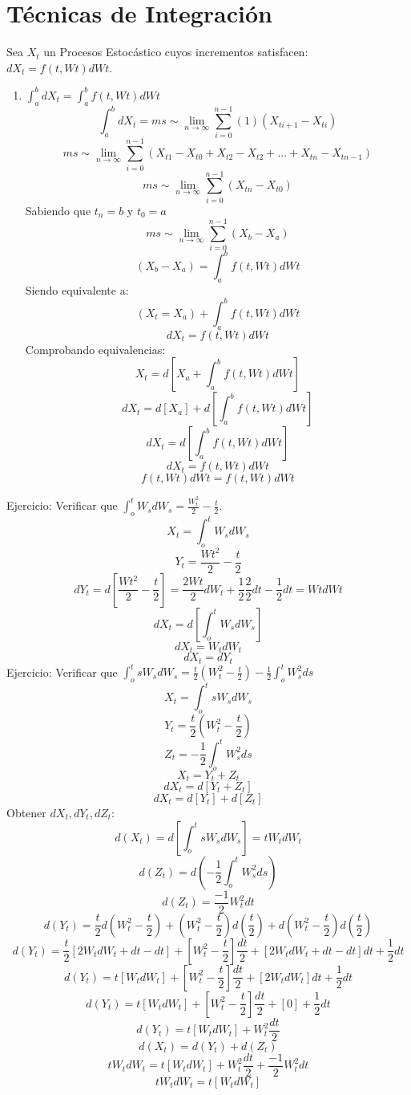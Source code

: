 \documentclass[11pt,fleqn]{book} %
\numberwithin{equation}{section} %
\numberwithin{figure}{section} %
\numberwithin{table}{section} %
\begin{document}
\section{Técnicas de Integración}
Sea $X_t$ un Procesos Estocástico cuyos incrementos satisfacen: $dX_t = f(t,Wt) dWt$.
\begin{enumerate}
    \item $\int_{a}^{b} dX_t = \int_{a}^{b} f(t,Wt) dWt$
    $$ \int_{a}^{b} dX_t = ms \sim \lim_{n \to \infty} \sum_{i=0}^{n-1} (1) (X_{ti+1}-X_{ti}) $$
    $$ ms\sim \lim_{n \to \infty} \sum_{i=0}^{n-1}  (X_{t1}-X_{t0} + X_{t2}-X_{t2} + ... + X_{tn}-X_{tn-1}) $$
    $$ ms\sim \lim_{n \to \infty} \sum_{i=0}^{n-1}  (X_{tn}-X_{t0}) $$
    Sabiendo que $t_{n} = b$ y $t_{0} = a$
    $$ ms\sim \lim_{n \to \infty} \sum_{i=0}^{n-1}  (X_{b}-X_{a}) $$
    $$ (X_{b}-X_{a}) = \int_{a}^{b} f(t,Wt) dWt $$
    Siendo equivalente a:
    $$ (X_{t} = X_{a}) +  \int_{a}^{b} f(t,Wt) dWt $$
    $$ dX_{t} = f(t,Wt) dWt $$
    Comprobando equivalencias:
    $$X_{t} = d [X_{a} +  \int_{a}^{b} f(t,Wt) dWt]$$
    $$dX_{t} = d [X_{a}] +  d [\int_{a}^{b} f(t,Wt) dWt]$$
    $$dX_{t} = d [\int_{a}^{b} f(t,Wt) dWt]$$
    $$dX_{t} = f(t,Wt) dWt$$
    $$f(t,Wt) dWt = f(t,Wt) dWt$$
\end{enumerate}
Ejercicio: Verificar que $\int_{o}^{t} W_{s}dW_{s} =\frac{W_{t}^{2}}{2}-\frac{t}{2} $.
$$X_{t} = \int_{o}^{t} W_{s}dW_{s} $$
$$Y_{t} = \frac{Wt^2}{2}  -  \frac{t}{2} $$
$$dY_{t} = d[ \frac{Wt^2}{2} - \frac{t}{2} ] = \frac{2Wt}{2} dW_{t} + \frac{1}{2} \frac{2}{2} dt - \frac{1}{2} dt = WtdWt $$
$$dX_{t} = d[\int_{o}^{t} W_{s}dW_{s}] $$
$$dX_{t} = W_{t}dW_{t}$$
$$dX_{t} = dY_{t}$$
Ejercicio: Verificar que $\int_{o}^{t} sW_{s}dW_{s} = \frac{t}{2} (W_{t}^{2}- \frac{t}{2}) - \frac{1}{2} \int_{o}^{t} W_{s}^{2} ds$
$$X_{t} = \int_{o}^{t}  sW_{s}dW_{s}$$
$$Y_{t} =  \frac{t}{2}  (W_{t}^{2}- \frac{t}{2} ) $$
$$Z_{t} = - \frac{1}{2} \int_{o}^{t}  W_{s}^{2} ds$$
$$X_{t} = Y_{t} + Z_{t}$$
$$dX_{t} = d[Y_{t} +Z_{t}]$$
$$dX_{t} = d[Y_{t}] + d[Z_{t}]$$
Obtener $ dX_{t}, dY_{t}, dZ_{t}  $:
$$d(X_{t}) = d[ \int_{o}^{t}  sW_{s}dW_{s} ] = tW_{t}dW_{t}$$
$$d(Z_{t}) = d(- \frac{1}{2} \int_{o}^{t}  W_{s}^{2} ds)$$
$$ d(Z_{t}) = \frac{-1}{2} W_{t}^{2} dt   $$
$$d(Y_{t}) = \frac{t}{2} d(W_{t}^{2} - \frac{t}{2}) + (W_{t}^{2} - \frac{t}{2}) d(\frac{t}{2}) + d(W_{t}^{2} - \frac{t}{2})d(\frac{t}{2}) $$
$$d(Y_{t}) = \frac{t}{2} [2W_{t} dW_{t} +dt -dt] + [W_{t}^{2} - \frac{t}{2}]\frac{dt}{2} + [2W_{t}dW_{t}+dt-dt]dt + \frac{1}{2} dt $$
$$d(Y_{t}) = t[W_{t} dW_{t}] + [W_{t}^{2} - \frac{t}{2}]\frac{dt}{2} + [2W_{t}dW_{t}]dt + \frac{1}{2} dt $$
$$d(Y_{t}) = t[W_{t} dW_{t}] + [W_{t}^{2} - \frac{t}{2}]\frac{dt}{2} + [0] + \frac{1}{2} dt $$
$$ d(Y_{t}) = t[W_{t} dW_{t}] + W_{t}^{2}\frac{dt}{2}  $$
$$ d(X_{t}) = d(Y_{t}) + d(Z_{t})$$
$$ tW_{t}dW_{t} = t[W_{t} dW_{t}] + W_{t}^{2}\frac{dt}{2} + \frac{-1}{2} W_{t}^{2} dt  $$
$$ tW_{t}dW_{t} = t[W_{t} dW_{t}] $$
\end{document}
